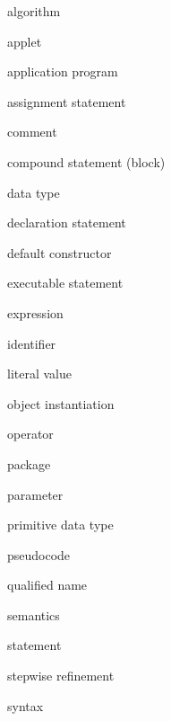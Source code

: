 \label{chapter-summary}
\label{technical-terms}
\begin{KT}
algorithm

applet

application program

assignment statement

comment 

compound statement (block)

data type

declaration statement

default constructor

executable statement

expression

identifier

literal value

object instantiation

operator

package

parameter

primitive data type

pseudocode

qualified name

semantics

statement

stepwise refinement

syntax

\end{KT}


